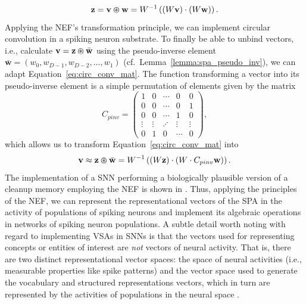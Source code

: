 \begin{equation}
\label{eq:circ_conv_mat}
\mathbf{z} = \mathbf{v} \varoast \mathbf{w} = W^{-1} \left( \left(W \mathbf{v}\right) \cdot \left(W \mathbf{w}\right)\right).
\end{equation}
Applying the \ac{NEF}'s transformation principle, we can implement circular convolution in a spiking neuron substrate.
To finally be able to unbind vectors, i.e., calculate $ \mathbf{v} = \mathbf{z} \varoast \bar{\mathbf{w}}$ using the pseudo-inverse element $ \bar{ \mathbf{w}} = \left(w_0, w_{D-1}, w_{D-2}, \ldots, w_{1}\right)$ (cf.\ Lemma~\ref{lemma:spa_pseudo_inv}), we can adapt Equation~\eqref{eq:circ_conv_mat}.
The function transforming a vector into its pseudo-inverse element is a simple permutation of elements given by the matrix 
\begin{equation}
\label{eq:mat}
C_{pinv} = \left(
    \begin{matrix}
        1 & 0 &  \cdots & 0  & 0 \\
        0 & 0 &  \cdots & 0  & 1 \\
        0 & 0 &  \cdots & 1  & 0 \\
        \vdots & \vdots  & \iddots & \vdots  & \vdots \\
        0 & 1 &  0 & \cdots  & 0 
    \end{matrix}
\right),
\end{equation}
which allows us to transform Equation~\eqref{eq:circ_conv_mat} into
\begin{equation}
\label{eq:unbind_mat}
\mathbf{v} \approx \mathbf{z} \varoast \bar{ \mathbf{w}} = W^{-1} \left( \left(W \mathbf{z}\right) \cdot \left(W \cdot C_{pinv} \mathbf{w}\right)\right).
\end{equation}
The implementation of a \ac{SNN} performing a biologically plausible version of a cleanup memory employing the \ac{NEF} is shown in \textcite{Stewart2011}.
Thus, applying the principles of the \ac{NEF}, we can represent the representational vectors of the \ac{SPA} in the activity of populations of spiking neurons and implement its algebraic operations in networks of spiking neuron populations.
A subtle detail worth noting with regard to implementing \acp{VSA} in \acp{SNN} is that the vectors used for representing concepts or entities of interest are \emph{not} vectors of neural activity.
That is, there are two distinct representational vector spaces: the space of neural activities (i.e., measurable properties like spike patterns) and the vector space used to generate the vocabulary and structured representations vectors, which in turn are represented by the activities of populations in the neural space \parencite[see][for further details]{Eliasmith2013}.

